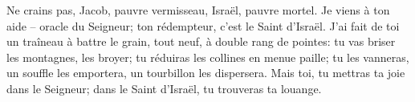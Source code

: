 Ne crains pas, Jacob, pauvre vermisseau,
	Israël, pauvre mortel.
Je viens à ton aide – oracle du Seigneur;
	ton rédempteur, c’est le Saint d’Israël.
J’ai fait de toi un traîneau à battre le grain,
	tout neuf, à double rang de pointes:
	tu vas briser les montagnes, les broyer;
	tu réduiras les collines en menue paille;
	tu les vanneras, un souffle les emportera,
	un tourbillon les dispersera.
Mais toi, tu mettras ta joie dans le Seigneur;
	dans le Saint d’Israël, tu trouveras ta louange.
